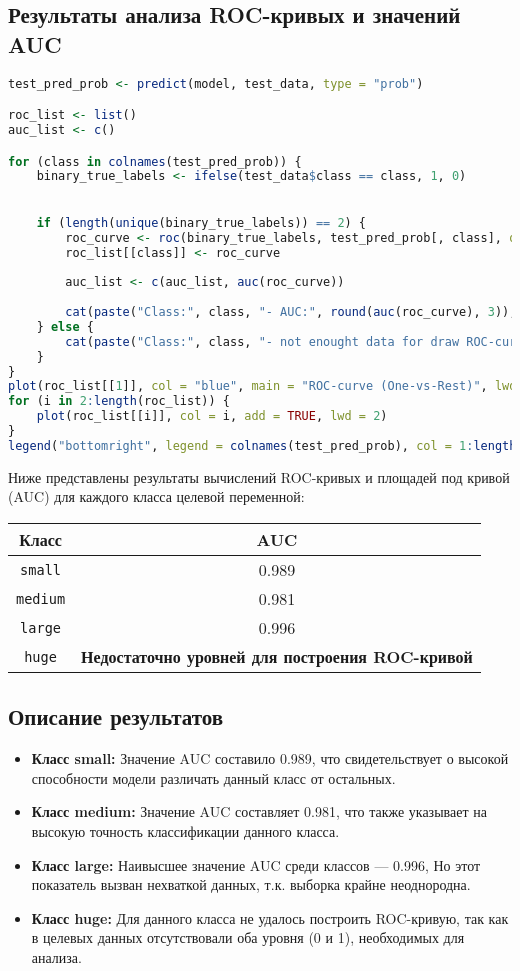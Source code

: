 \subsection*{Результаты анализа ROC-кривых и значений AUC}
\begin{lstlisting}[language=R, caption={Построение и анализ ROC-кривых}]
test_pred_prob <- predict(model, test_data, type = "prob")

roc_list <- list()
auc_list <- c()

for (class in colnames(test_pred_prob)) {
	binary_true_labels <- ifelse(test_data$class == class, 1, 0)
	

	if (length(unique(binary_true_labels)) == 2) {
		roc_curve <- roc(binary_true_labels, test_pred_prob[, class], quiet = TRUE)
		roc_list[[class]] <- roc_curve
		
		auc_list <- c(auc_list, auc(roc_curve))
		
		cat(paste("Class:", class, "- AUC:", round(auc(roc_curve), 3)), "\n")
	} else {
		cat(paste("Class:", class, "- not enought data for draw ROC-curve\n"))
	}
}
plot(roc_list[[1]], col = "blue", main = "ROC-curve (One-vs-Rest)", lwd = 2)
for (i in 2:length(roc_list)) {
	plot(roc_list[[i]], col = i, add = TRUE, lwd = 2)
}
legend("bottomright", legend = colnames(test_pred_prob), col = 1:length(roc_list), lwd = 2)


\end{lstlisting}

Ниже представлены результаты вычислений ROC-кривых и площадей под кривой (AUC) для каждого класса целевой переменной:

\begin{longtable}{|c|c|}
	\hline
	\textbf{Класс} & \textbf{AUC} \\ 
	\hline
	\texttt{small}  & 0.989 \\
	\texttt{medium} & 0.981 \\
	\texttt{large}  & 0.996 \\
	\texttt{huge}   & \textbf{Недостаточно уровней для построения ROC-кривой} \\
	\hline
\end{longtable}

\subsection*{Описание результатов}
\begin{itemize}
	\item \textbf{Класс small:} Значение AUC составило 0.989, что свидетельствует о высокой способности модели различать данный класс от остальных.
	\item \textbf{Класс medium:} Значение AUC составляет 0.981, что также указывает на высокую точность классификации данного класса.
	\item \textbf{Класс large:} Наивысшее значение AUC среди классов — 0.996, Но этот показатель вызван нехваткой данных, т.к. выборка крайне неоднородна.
	\item \textbf{Класс huge:} Для данного класса не удалось построить ROC-кривую, так как в целевых данных отсутствовали оба уровня (0 и 1), необходимых для анализа.
\end{itemize}

